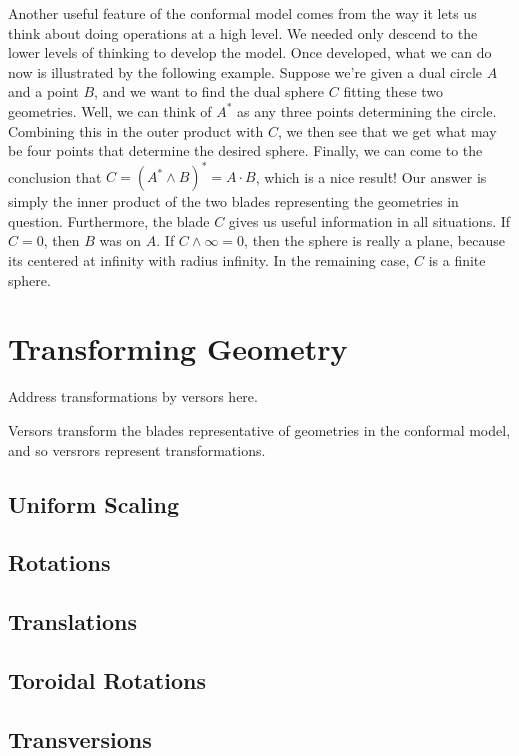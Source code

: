 \documentclass[12pt]{article}
\newcommand{\nvai}{\infty}
\begin{document}
Another useful feature of the conformal model comes from the way it lets
us think about doing operations at a high level.  We needed only descend to
the lower levels of thinking to develop the model.  Once developed, what we can do now is illustrated
by the following example.  Suppose we're given a dual circle $A$ and
a point $B$, and we want to find the dual sphere $C$ fitting these two geometries.
Well, we can think of $A^*$ as any three points determining the circle.
Combining this in the outer product with $C$, we then see that we
get what may be four points that determine the desired sphere.
Finally, we can come to the conclusion that $C=(A^*\wedge B)^*=A\cdot B$,
which is a nice result!  Our answer is simply the inner product of the two blades
representing the geometries in question.  Furthermore, the blade $C$ gives
us useful information in all situations.  If $C=0$, then $B$ was on $A$.
If $C\wedge\nvai=0$, then the sphere is really a plane, because its
centered at infinity with radius infinity.  In the remaining case, $C$ is
a finite sphere.

\section{Transforming Geometry}

Address transformations by versors here.

Versors transform the blades representative of geometries in the conformal model,
and so versrors represent transformations.

\subsection{Uniform Scaling}

\subsection{Rotations}

\subsection{Translations}

\subsection{Toroidal Rotations}

\subsection{Transversions}
\end{document}
